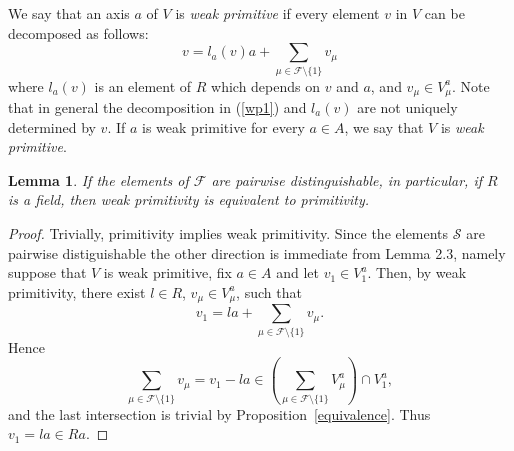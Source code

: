 \documentclass[a4paper]{amsart}
\newtheorem{lemma}{Lemma}[section]
\begin{document}
We say that an axis $a$ of $V$ is {\it weak primitive} if every element $v$ in $V$ can be decomposed as follows:
\begin{equation}\label{wp1}
v=l_a(v)a+\sum_{\mu\in \mathcal F\setminus \{1\}}v_\mu
\end{equation}
where $l_a(v)$ is an element of $R$ which depends on $v$ and $a$, and $v_\mu\in V^a_\mu$. 
Note that in general the decomposition in (\ref{wp1}) and $l_a(v)$ are not uniquely determined by $v$. If $a$ is weak primitive for every $a\in A$, we say that $V$ is {\it weak primitive}.
\begin{lemma}\label{pp}
If the elements of $\mathcal F$ are pairwise distinguishable, in particular, if $R$ is a field, then weak primitivity is equivalent to primitivity. 
\end{lemma}
\begin{proof}
Trivially, primitivity implies weak primitivity. Since the elements $\mathcal{S}$ are pairwise distiguishable the other direction is immediate from Lemma 2.3, namely suppose that $V$ is weak primitive, fix $a\in A$ and let $v_1\in V^a_1$. Then, by weak primitivity, there exist $l\in R$, $v_\mu\in V^a_\mu$, such that 
$$
v_1=la+\sum_{\mu\in \mathcal F\setminus \{1\}}v_\mu.
$$
Hence 
$$\sum_{\mu\in \mathcal F\setminus \{1\}}v_\mu=v_1-la\in (\sum_{\mu\in \mathcal F\setminus \{1\}}V^a_\mu )\cap V^a_1,
$$
and the last intersection is  trivial by Proposition~\ref{equivalence}. Thus $v_1=la\in Ra$.
\end{proof}
\end{document}
